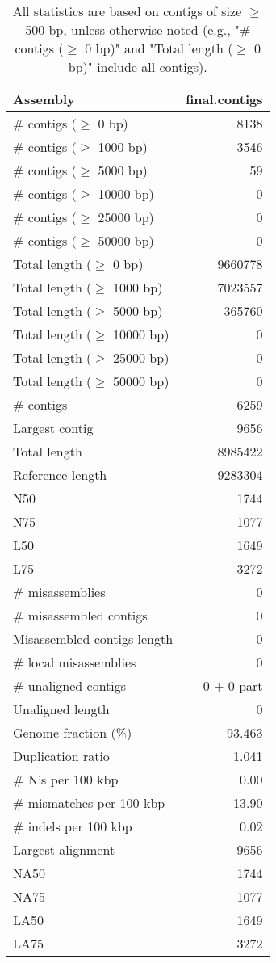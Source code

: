 \documentclass[12pt,a4paper]{article}
\begin{document}
\begin{table}[ht]
\begin{center}
\caption{All statistics are based on contigs of size $\geq$ 500 bp, unless otherwise noted (e.g., "\# contigs ($\geq$ 0 bp)" and "Total length ($\geq$ 0 bp)" include all contigs).}
\begin{tabular}{|l*{1}{|r}|}
\hline
Assembly & final.contigs \\ \hline
\# contigs ($\geq$ 0 bp) & 8138 \\ \hline
\# contigs ($\geq$ 1000 bp) & 3546 \\ \hline
\# contigs ($\geq$ 5000 bp) & 59 \\ \hline
\# contigs ($\geq$ 10000 bp) & 0 \\ \hline
\# contigs ($\geq$ 25000 bp) & 0 \\ \hline
\# contigs ($\geq$ 50000 bp) & 0 \\ \hline
Total length ($\geq$ 0 bp) & 9660778 \\ \hline
Total length ($\geq$ 1000 bp) & 7023557 \\ \hline
Total length ($\geq$ 5000 bp) & 365760 \\ \hline
Total length ($\geq$ 10000 bp) & 0 \\ \hline
Total length ($\geq$ 25000 bp) & 0 \\ \hline
Total length ($\geq$ 50000 bp) & 0 \\ \hline
\# contigs & 6259 \\ \hline
Largest contig & 9656 \\ \hline
Total length & 8985422 \\ \hline
Reference length & 9283304 \\ \hline
N50 & 1744 \\ \hline
N75 & 1077 \\ \hline
L50 & 1649 \\ \hline
L75 & 3272 \\ \hline
\# misassemblies & 0 \\ \hline
\# misassembled contigs & 0 \\ \hline
Misassembled contigs length & 0 \\ \hline
\# local misassemblies & 0 \\ \hline
\# unaligned contigs & 0 + 0 part \\ \hline
Unaligned length & 0 \\ \hline
Genome fraction (\%) & 93.463 \\ \hline
Duplication ratio & 1.041 \\ \hline
\# N's per 100 kbp & 0.00 \\ \hline
\# mismatches per 100 kbp & 13.90 \\ \hline
\# indels per 100 kbp & 0.02 \\ \hline
Largest alignment & 9656 \\ \hline
NA50 & 1744 \\ \hline
NA75 & 1077 \\ \hline
LA50 & 1649 \\ \hline
LA75 & 3272 \\ \hline
\end{tabular}
\end{center}
\end{table}
\end{document}

